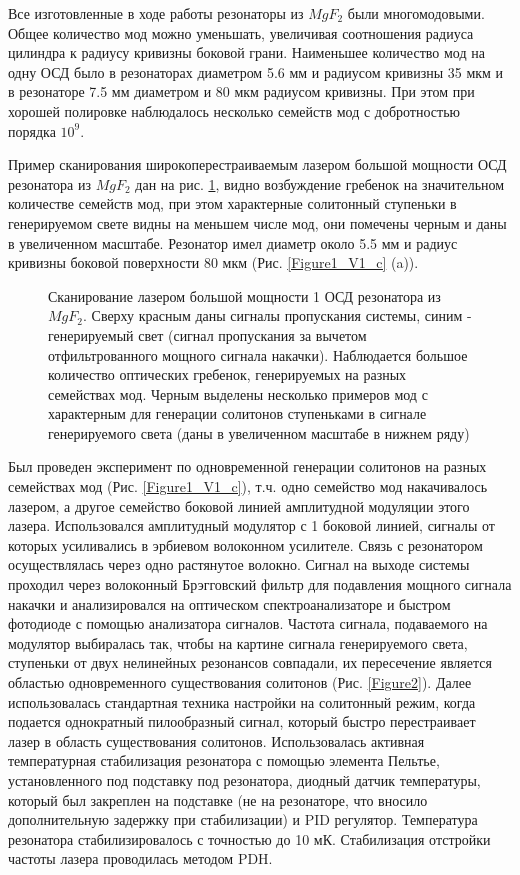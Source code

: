 Все изготовленные в ходе работы резонаторы из $MgF_2$ были многомодовыми. Общее количество мод можно уменьшать, увеличивая соотношения радиуса цилиндра к радиусу кривизны боковой грани. Наименьшее количество мод на одну ОСД было в резонаторах диаметром 5.6 мм и радиусом кривизны 35 мкм и в резонаторе 7.5 мм диаметром и 80 мкм радиусом кривизны. При этом при хорошей полировке наблюдалось несколько семейств мод с добротностью порядка $10^9$. 

Пример сканирования широкоперестраиваемым лазером большой мощности ОСД резонатора из $MgF_2$ дан на рис. \ref{Scan_SolitonSpot}, видно возбуждение гребенок на значительном количестве семейств мод, при этом характерные солитонный ступеньки в генерируемом свете видны на меньшем числе мод, они помечены черным и даны в увеличенном масштабе. Резонатор имел диаметр около 5.5 мм и радиус кривизны боковой поверхности 80 мкм (Рис. \ref{Figure1_V1_c} (a)).

\begin{figure}[ht]
\begin{minipage}[ht]{1\linewidth}
\end{minipage}
\caption{Сканирование лазером большой мощности 1 ОСД резонатора из $MgF_2$. Сверху красным даны сигналы пропускания системы, синим - генерируемый свет (сигнал пропускания за вычетом отфильтрованного мощного сигнала накачки). Наблюдается большое количество оптических гребенок, генерируемых на разных семействах мод. Черным выделены несколько примеров мод с характерным для генерации солитонов ступеньками в сигнале генерируемого света (даны в увеличенном масштабе в нижнем ряду)}
\label{Scan_SolitonSpot}
\end{figure}

Был проведен эксперимент по одновременной генерации солитонов на разных семействах мод (Рис. \ref{Figure1_V1_c}), т.ч. одно семейство мод накачивалось лазером, а другое семейство боковой линией амплитудной модуляции этого лазера. Использовался амплитудный модулятор с 1 боковой линией, сигналы от которых усиливались в эрбиевом волоконном усилителе. Связь с резонатором осуществлялась через одно растянутое волокно. Сигнал на выходе системы проходил через волоконный Брэгговский фильтр для подавления мощного сигнала накачки и анализировался на оптическом спектроанализаторе и быстром фотодиоде с помощью анализатора сигналов. Частота сигнала, подаваемого на модулятор выбиралась так, чтобы на картине сигнала генерируемого света, ступеньки от двух нелинейных резонансов совпадали, их пересечение является областью одновременного существования солитонов (Рис. \ref{Figure2}). Далее использовалась стандартная техника настройки на солитонный режим, когда подается однократный пилообразный сигнал, который быстро перестраивает лазер в область существования солитонов. Использовалась активная температурная стабилизация резонатора с помощью элемента Пельтье, установленного под подставку под резонатора, диодный датчик температуры, который был закреплен на подставке (не на резонаторе, что вносило дополнительную задержку при стабилизации) и PID регулятор. Температура резонатора стабилизировалось с точностью до 10 мК. Стабилизация отстройки частоты лазера проводилась методом PDH.

